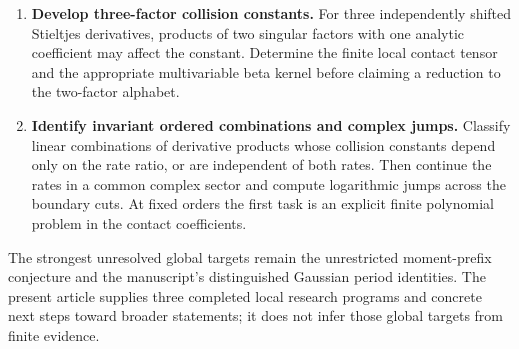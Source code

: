 \begin{enumerate}[label=\textbf{Q\arabic*.},leftmargin=*]
\item \textbf{Develop three-factor collision constants.}
For three independently shifted Stieltjes derivatives,
products of two singular factors with one analytic coefficient
may affect the constant. Determine the finite local contact
tensor and the appropriate multivariable beta kernel before
claiming a reduction to the two-factor alphabet.

\item \textbf{Identify invariant ordered combinations and complex jumps.}
Classify linear combinations of derivative products whose
collision constants depend only on the rate ratio, or are
independent of both rates. Then continue the rates in a
common complex sector and compute logarithmic jumps across
the boundary cuts. At fixed orders the first task is an
explicit finite polynomial problem in the contact coefficients.
\end{enumerate}

The strongest unresolved global targets remain the unrestricted
moment-prefix conjecture and the manuscript's distinguished
Gaussian period identities. The present article supplies three
completed local research programs and concrete next steps toward
broader statements; it does not infer those global targets from
finite evidence.

